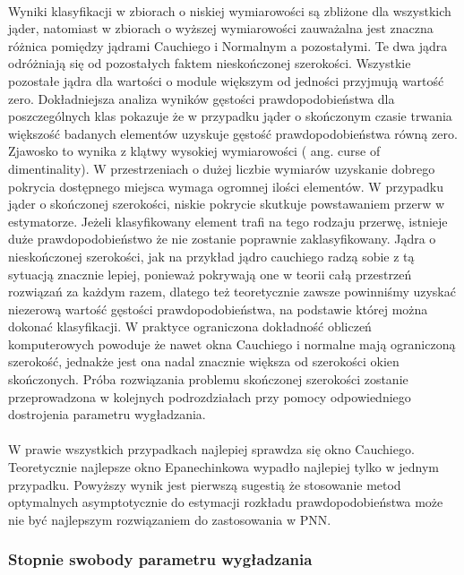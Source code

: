 \documentclass[a4paper,12pt,twoside]{article}
\begin{document}
\paragraph{}
Wyniki klasyfikacji w zbiorach o niskiej wymiarowości są zbliżone dla wszystkich jąder, natomiast w zbiorach o wyższej wymiarowości zauważalna jest znaczna różnica pomiędzy jądrami Cauchiego i Normalnym a pozostałymi. Te dwa jądra odróżniają się od pozostałych faktem nieskończonej szerokości. Wszystkie pozostałe jądra dla wartości o module większym od jedności przyjmują wartość zero. Dokładniejsza analiza wyników gęstości prawdopodobieństwa dla poszczególnych klas pokazuje że w przypadku jąder o skończonym czasie trwania większość badanych elementów uzyskuje gęstość prawdopodobieństwa równą zero. Zjawosko to wynika z klątwy wysokiej wymiarowości ( ang. curse of dimentinality). W przestrzeniach o dużej liczbie wymiarów uzyskanie dobrego pokrycia dostępnego miejsca wymaga ogromnej ilości elementów. W przypadku jąder o skończonej szerokości, niskie pokrycie skutkuje powstawaniem przerw w estymatorze. Jeżeli klasyfikowany element trafi na tego rodzaju przerwę, istnieje duże prawdopodobieństwo że nie zostanie poprawnie zaklasyfikowany. Jądra o nieskończonej szerokości, jak na przykład jądro cauchiego radzą sobie z tą sytuacją znacznie lepiej, ponieważ pokrywają one w teorii całą przestrzeń rozwiązań za każdym razem, dlatego też teoretycznie zawsze powinniśmy uzyskać niezerową wartość gęstości prawdopodobieństwa, na podstawie której można dokonać klasyfikacji. W praktyce ograniczona dokładność obliczeń komputerowych powoduje że nawet okna Cauchiego i normalne mają ograniczoną szerokość, jednakże jest ona nadal znacznie większa od szerokości okien skończonych. Próba rozwiązania problemu skończonej szerokości zostanie przeprowadzona w kolejnych podrozdziałach przy pomocy odpowiedniego dostrojenia parametru wygładzania. 
\paragraph{}
W prawie wszystkich przypadkach najlepiej sprawdza się okno Cauchiego. Teoretycznie najlepsze okno Epanechinkowa wypadło najlepiej tylko w jednym przypadku. Powyższy wynik jest pierwszą sugestią że stosowanie metod optymalnych asymptotycznie do estymacji rozkładu prawdopodobieństwa może nie być najlepszym rozwiązaniem do zastosowania w PNN.
\subsubsection{Stopnie swobody parametru wygładzania}
\end{document}

